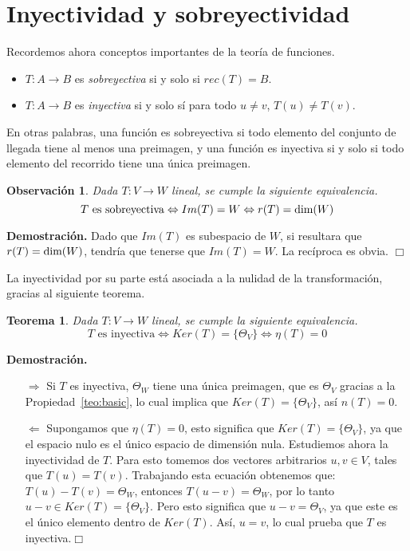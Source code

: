 \documentclass[12pt]{book}
\newtheorem{teo}{Teorema}
\newtheorem{obs}{Observaci\'on}
\def\dim{\textup{dim}}
\begin{document}
\section{Inyectividad y sobreyectividad}

    
Recordemos ahora conceptos importantes de la teoría de funciones.

\begin{itemize}
\item $T:A\rightarrow B$ es \emph{sobreyectiva} si y solo si $rec(T)=B$.
\item $T:A\rightarrow B$ es \emph{inyectiva} si y solo sí para todo $u\not=v$, $T(u)\not=T(v)$.
\end{itemize}

En otras palabras, una función es sobreyectiva si todo elemento del conjunto de llegada tiene al menos una preimagen, y una función es inyectiva si y solo si todo elemento del recorrido tiene una única preimagen.

\begin{obs}
Dada $T:V\rightarrow W$ lineal, se cumple la siguiente equivalencia.
$$ T\textrm{ es sobreyectiva} \Leftrightarrow Im(T)=W\Leftrightarrow r(T)=\dim(W)$$
\end{obs}
{\bf Demostración.} {\small Dado que $Im(T)$ es subespacio de $W$, si resultara que $r(T)=\dim(W)$, tendría que tenerse que $Im(T)=W$.
La recíproca es obvia.
\hfill $\Box$
}

La inyectividad por su parte está asociada a la nulidad de la transformación, gracias al siguiente teorema.

\begin{teo}
Dada $T:V\rightarrow W$ lineal, se cumple la siguiente equivalencia.
$$ T\textrm{ es inyectiva} \Leftrightarrow Ker(T)=\{\Theta_V\} \Leftrightarrow \eta(T)=0$$
\end{teo}
{\bf Demostración.} {\small
\begin{itemize}
\item[$\Rightarrow$] Si $T$ es inyectiva, $\Theta_W$ tiene una única preimagen, que es $\Theta_V$ gracias a la Propiedad~\ref{teo:basic}, lo cual implica que $Ker(T)=\{\Theta_V\}$, así $n(T)=0$.
\item[$\Leftarrow$] Supongamos que $\eta(T)=0$, esto significa que $Ker(T)=\{\Theta_V\}$, ya que el espacio nulo es el único espacio de dimensión nula.
Estudiemos ahora la inyectividad de $T$.
Para esto tomemos dos vectores arbitrarios $u,v \in V$, tales que $T(u)=T(v)$.
Trabajando esta ecuación obtenemos que: $T(u)-T(v)=\Theta_W$, entonces $T(u-v)=\Theta_W$, por lo tanto $u-v\in Ker(T)=\{\Theta_V\}$.
Pero esto significa que $u-v=\Theta_V$, ya que este es el único elemento dentro de $Ker(T)$.
Así, $u=v$, lo cual prueba que $T$ es inyectiva.\hfill $\Box$
\end{itemize}

}
\end{document}
